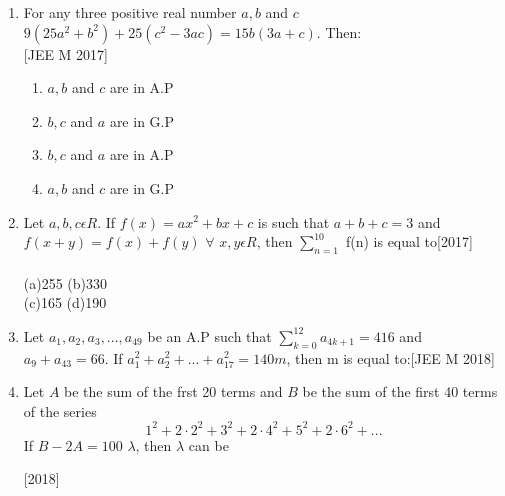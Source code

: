 \documentclass[journal,12pt,twocolumn]{IEEEtran}
\theoremstyle{remark}
\begin{document}
\begin{enumerate}
 \item{For any three positive real number $a,b$ and $c$ $9(25a^2+b^2)+ 25(c^2-3ac) = 15b(3a+c)$. Then:\\ \null \hfill{[JEE M 2017]}\begin{multicols}{2}
	 \begin{enumerate}\itemsep.5em
  \item{$a,b$ and $c$ are in A.P}
  \item{$b,c$ and $a$ are in G.P}
  \columnbreak
  \item{$b,c$ and $a$ are in A.P}
  \item{$a,b$ and $c$ are in G.P}
  \end{enumerate}
  \end{multicols}}
  \item{Let $a,b,c\epsilon R$. If $f(x)=ax^2+bx+c$ is such that $a+b+c=3$ and $f(x+y)=f(x)+f(y)$ $\forall$ $x,y \epsilon R$, then $\sum _{n=1}^{10}$  f(n)  is  equal  to\hfill{[2017]}\\\\(a)255 \hspace{2cm}(b)330\\(c)165 \hspace{2cm}(d)190} 
  \item{Let $a_{1},a_{2},a_{3},...,a_{49}$ be an A.P such that $\sum_{k=0}^{12} a_{4k+1}=416$ and $a_{9}+a_{43}=66$. If $a_{1}^2+ a_{2}^{2}+...+a_{17}^{2}=140m$, then m is equal to:\hfill{[JEE M 2018]}\begin{enumerate}
  \end{enumerate}}
  \item{Let $A$ be the sum of the frst 20 terms and $B$ be the sum of the first 40 terms of the series \[1^{2} +2\cdot2^{2}+3^{2}+2\cdot4^{2}+5^{2}+2\cdot6^{2}+...\] If $B-2A=100$ $\lambda$, then $\lambda$ can be\hfill{[2018]\begin{enumerate}

\end{enumerate}}}
\end{enumerate}
\end{document}
